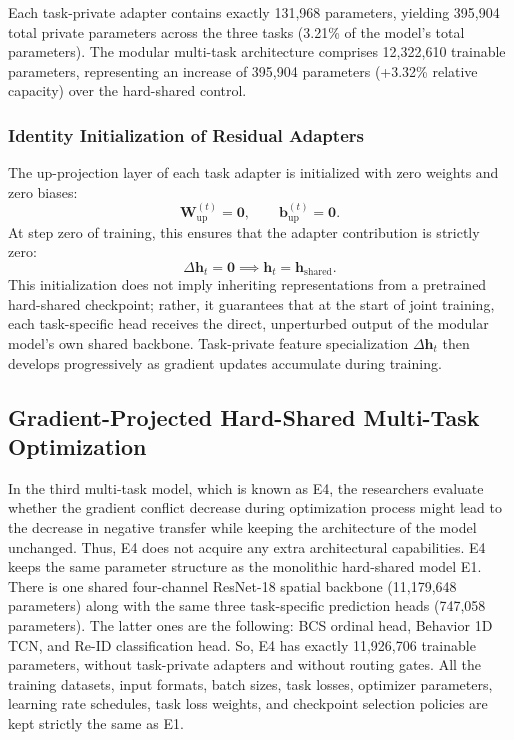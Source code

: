 Each task-private adapter contains exactly 131,968 parameters, yielding 395,904 total private parameters across the three tasks (3.21\% of the model's total parameters). The modular multi-task architecture comprises 12,322,610 trainable parameters, representing an increase of 395,904 parameters (+3.32\% relative capacity) over the hard-shared control.

\subsubsection{Identity Initialization of Residual Adapters}

The up-projection layer of each task adapter is initialized with zero weights and zero biases:
\begin{equation}
 \mathbf{W}_{\mathrm{up}}^{(t)} = \mathbf{0}, \qquad \mathbf{b}_{\mathrm{up}}^{(t)} = \mathbf{0}.
\end{equation}
At step zero of training, this ensures that the adapter contribution is strictly zero:
\begin{equation}
 \Delta\mathbf{h}_t = \mathbf{0} \implies \mathbf{h}_t = \mathbf{h}_{\mathrm{shared}}.
\end{equation}
This initialization does not imply inheriting representations from a pretrained hard-shared checkpoint; rather, it guarantees that at the start of joint training, each task-specific head receives the direct, unperturbed output of the modular model's own shared backbone. Task-private feature specialization $\Delta\mathbf{h}_t$ then develops progressively as gradient updates accumulate during training.

\subsection{Gradient-Projected Hard-Shared Multi-Task Optimization}

In the third multi-task model, which is known as E4, the researchers evaluate whether the gradient conflict decrease during optimization process might lead to the decrease in negative transfer while keeping the architecture of the model unchanged. Thus, E4 does not acquire any extra architectural capabilities. E4 keeps the same parameter structure as the monolithic hard-shared model E1. There is one shared four-channel ResNet-18 spatial backbone (11,179,648 parameters) along with the same three task-specific prediction heads (747,058 parameters). The latter ones are the following: BCS ordinal head, Behavior 1D TCN, and Re-ID classification head. So, E4 has exactly 11,926,706 trainable parameters, without task-private adapters and without routing gates. All the training datasets, input formats, batch sizes, task losses, optimizer parameters, learning rate schedules, task loss weights, and checkpoint selection policies are kept strictly the same as E1.

